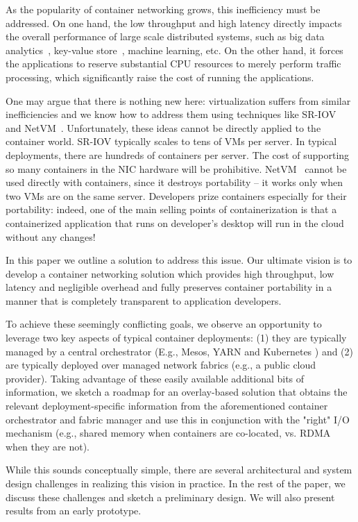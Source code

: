 As the popularity of container networking grows, this inefficiency must be
addressed. On one hand, the low throughput and high latency directly impacts the
overall performance of large scale distributed systems, such as big data
analytics~\cite{choudhury-paper}, key-value
store~\cite{farm}, machine learning, etc.  On the other hand,
it forces the applications to reserve substantial CPU resources to merely
perform traffic processing, which significantly raise the cost of running the
applications.

One may argue that there is nothing new here: virtualization suffers from
similar inefficiencies and we know how to address them using techniques like
SR-IOV~\cite{sriov} and NetVM~\cite{netvm}. Unfortunately, these ideas cannot be
directly applied to the container world.  SR-IOV typically scales to tens of VMs
per server. In typical deployments, there are hundreds of containers per server.
The cost of supporting so many containers in the NIC hardware will be
prohibitive.  NetVM~\cite{netvm} cannot be used directly with containers, since
it destroys portability -- it works only when two VMs are on the same server.
Developers prize containers especially for their portability: indeed, one of the
main selling points of containerization is that a containerized application that
runs on developer's desktop will run in the cloud without any changes! 

In this paper we outline a solution to address this issue.  Our ultimate vision
is to develop a container networking solution which provides high throughput,
low latency and negligible overhead and fully preserves container portability in
a manner that is completely transparent to application developers. 

To achieve these seemingly conflicting goals, we observe an opportunity to
leverage two key aspects of typical container deployments: (1) they are
typically managed by a central orchestrator (E.g., Mesos, YARN and Kubernetes
\cite{mesos,yarn,kubernetes}) and (2) are typically deployed over managed network
fabrics (e.g., a public cloud provider). Taking advantage of these easily
available additional bits of information, we sketch a roadmap for an
overlay-based solution  that obtains the relevant deployment-specific
information from the aforementioned container orchestrator and fabric manager
and use this in conjunction with the "right" I/O mechanism (e.g., shared memory
when containers are co-located, vs. RDMA when they are not). 

While this sounds conceptually simple, there are several architectural
and system design challenges in realizing this vision in practice. In the rest
of the paper, we discuss these challenges and sketch a preliminary design. We
will also present results from an early prototype.
